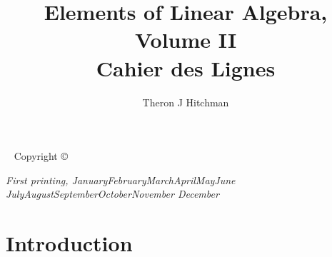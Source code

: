 \documentclass{tufte-book}
\title{Elements of Linear Algebra, Volume II\\Cahier des Lignes}
\author[TJH]{Theron J Hitchman}
\newcommand{\monthyear}{%
  \ifcase\month\or January\or February\or March\or April\or May\or June\or
  July\or August\or September\or October\or November\or
  December\fi\space\number\year
}
\newcommand{\openepigraph}[2]{%
  \begin{fullwidth}
  \sffamily\large
  \begin{doublespace}
  \noindent\allcaps{#1}\\%
  \noindent\allcaps{#2}%
  \end{doublespace}
  \end{fullwidth}
}
\newcommand{\blankpage}{\newpage\hbox{}\thispagestyle{empty}\newpage}
\theoremstyle{definition}
\begin{document}
\frontmatter


%



\maketitle


\newpage
\begin{fullwidth}
~\vfill
\thispagestyle{empty}
\setlength{\parindent}{0pt}
\setlength{\parskip}{\baselineskip}
Copyright \copyright\ \the\year\ \thanklessauthor

\par{}

\par{}


\par\textit{First printing, \monthyear}
\end{fullwidth}

\tableofcontents

%
%


\cleardoublepage
\chapter*{Introduction}
\end{document}
